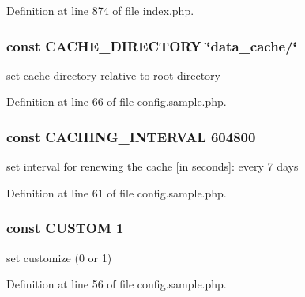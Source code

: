 Definition at line 874 of file index.\+php.

\subsubsection[{\texorpdfstring{C\+A\+C\+H\+E\+\_\+\+D\+I\+R\+E\+C\+T\+O\+RY}{CACHE_DIRECTORY}}]{\setlength{\rightskip}{0pt plus 5cm}const C\+A\+C\+H\+E\+\_\+\+D\+I\+R\+E\+C\+T\+O\+RY \char`\"{}data\+\_\+cache/\char`\"{}}\hypertarget{namespace_bms_a43e84be6597c73c02e67db0dc944cd1a}{}\label{namespace_bms_a43e84be6597c73c02e67db0dc944cd1a}
set cache directory relative to root directory 

Definition at line 66 of file config.\+sample.\+php.

\subsubsection[{\texorpdfstring{C\+A\+C\+H\+I\+N\+G\+\_\+\+I\+N\+T\+E\+R\+V\+AL}{CACHING_INTERVAL}}]{\setlength{\rightskip}{0pt plus 5cm}const C\+A\+C\+H\+I\+N\+G\+\_\+\+I\+N\+T\+E\+R\+V\+AL 604800}\hypertarget{namespace_bms_ac3ff4673172a882fa4a11351118e2716}{}\label{namespace_bms_ac3ff4673172a882fa4a11351118e2716}
set interval for renewing the cache \mbox{[}in seconds\mbox{]}\+: every 7 days 

Definition at line 61 of file config.\+sample.\+php.

\subsubsection[{\texorpdfstring{C\+U\+S\+T\+OM}{CUSTOM}}]{\setlength{\rightskip}{0pt plus 5cm}const C\+U\+S\+T\+OM 1}\hypertarget{namespace_bms_a4b14ca0fbcdfa3f37da752304008a9c1}{}\label{namespace_bms_a4b14ca0fbcdfa3f37da752304008a9c1}
set customize (0 or 1) 

Definition at line 56 of file config.\+sample.\+php.

